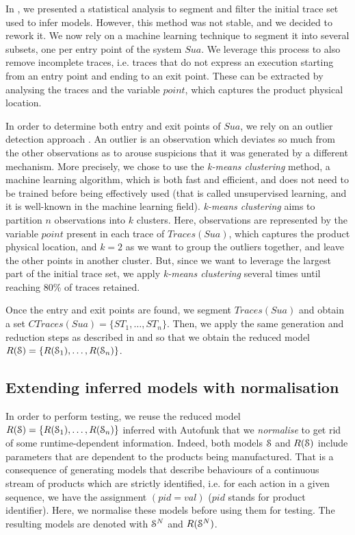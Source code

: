 In
,
we presented a statistical analysis to segment and filter the
initial trace set used to infer models. However, this method was
not stable, and we decided to rework it. We now rely on a machine
learning technique to segment it into several subsets, one per
entry point of the system $\mathit{Sua}$. We leverage this
process to also remove incomplete traces, i.e. traces that do not
express an execution starting from an entry point and ending to
an exit point. These can be extracted by analysing the traces and
the variable $point$, which captures the product physical
location.

In order to determine both entry and exit points of
$\mathit{Sua}$, we rely on an outlier detection approach
\cite{1695852}. An outlier is an observation which deviates so
much from the other observations as to arouse suspicions that it
was generated by a different mechanism. More precisely, we chose
to use the \textit{k-means clustering} method, a machine learning
algorithm, which is both fast and efficient, and does not need to
be trained before being effectively used (that is called
unsupervised learning, and it is well-known in the machine
learning field). \textit{k-means clustering} aims to partition
$n$ observations into $k$ clusters.  Here, observations are
represented by the variable $point$ present in each trace of
$Traces({Sua})$, which captures the product physical location,
and $k=2$ as we want to group the outliers together, and leave
the other points in another cluster. But, since we want to
leverage the largest part of the initial trace set, we apply
\textit{k-means clustering} several times until reaching 80\% of
traces retained.

Once the entry and exit points are found, we segment
$Traces({Sua})$ and obtain a set $CTraces({Sua})=\{ST_1, \dots,
ST_n\}$. Then, we apply the same generation and reduction steps
as described in
and
so that we obtain the reduced model $R(\EuScript{S}) =
\{R(\EuScript{S}_1),\dots,R(\EuScript{S}_n)\}$.

\subsection{Extending inferred models with normalisation}
\label{sec:testing:offpassive:normal}

In order to perform testing, we reuse the reduced model
$R(\EuScript{S}) = \{R(\EuScript{S}_1),\dots,R(\EuScript{S}_n)\}$
inferred with Autofunk that we \textit{normalise} to get rid of
some runtime-dependent information.  Indeed, both models
$\EuScript{S}$ and $R(\EuScript{S})$ include parameters that are
dependent to the products being manufactured.  That is a
consequence of generating models that describe behaviours of a
continuous stream of products which are strictly identified, i.e.
for each action in a given sequence, we have the assignment $(pid
= val)$ ($pid$ stands for product identifier).  Here, we
normalise these models before using them for testing.  The
resulting models are denoted with $\EuScript{S}^{N}$ and
$R(\EuScript{S}^{N})$.

